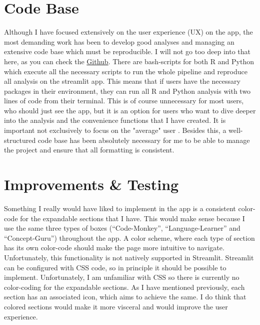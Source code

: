 \documentclass[12pt]{article}
\begin{document}
\section{Code Base}
Although I have focused extensively on the user experience (UX) on the app,
the most demanding work has been to develop good analyses and managing an extensive
code base which must be reproducible. I will not go too deep into that here,
as you can check the
\href{https://github.com/victor-m-p/BayesWorkflow}{Github}.
There are bash-scripts for both R and Python
which execute all the necessary scripts to run the whole pipeline
and reproduce all analysis on the streamlit app. This means that if users have
the necessary packages in their environment, they can run all R and Python analysis
with two lines of code from their terminal. This is of course unnecessary for most users,
who should just see the app, but it is an option for users who want to dive deeper
into the analysis and the convenience functions that I have created. It is
important not exclusively to focus on the "average" user
\autocite[14]{mills1992macintosh}.
Besides this, a well-structured code base has been absolutely necessary for me to
be able to manage the project and ensure that all formatting is consistent.

\section{Improvements \& Testing}
Something I really would have liked to implement in the app is a consistent
color-code for the expandable sections that I have. This would make sense
because I use the same three types of boxes (“Code-Monkey”, “Language-Learner” and “Concept-Guru”)
throughout the app. A color scheme, where each type of section has its own color-code
should make the page more intuitive to navigate. Unfortunately, this functionality
is not natively supported in Streamlit. Streamlit can be configured with CSS code,
so in principle it should be possible to implement. Unfortunately, I am unfamiliar
with CSS so there is currently no color-coding for the expandable sections.
As I have mentioned previously, each section has an associated icon,
which aims to achieve the same. I do think that colored sections would make
it more visceral and would improve the user experience.

\vspace{5mm}
\end{document}
